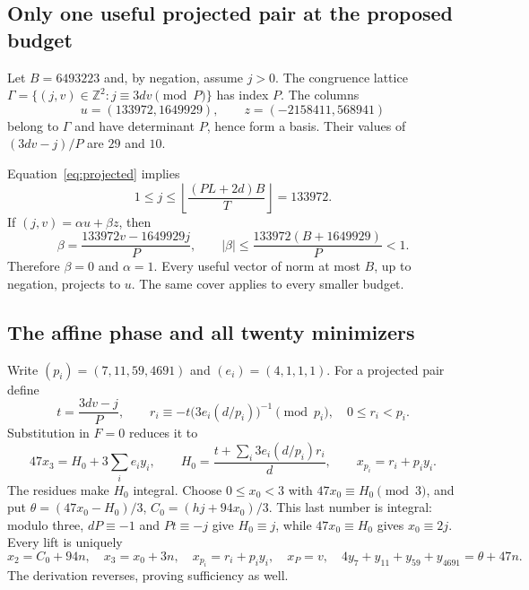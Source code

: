 \documentclass[11pt,a4paper]{article}
\theoremstyle{definition}\newtheorem{question}[theorem]{Question}
\theoremstyle{remark}\newtheorem{remark}[theorem]{Remark}
\newcommand{\Z}{\mathbb Z}\newcommand{\R}{\mathbb R}
\begin{document}
\subsection{Only one useful projected pair at the proposed budget}
Let \(B=6493223\) and, by negation, assume \(j>0\).
The congruence lattice
\(\Gamma=\{(j,v)\in\Z^2:j\equiv3dv\pmod P\}\) has index \(P\).
The columns
\[
 u=(133972,1649929),\qquad z=(-2158411,568941)
\]
belong to \(\Gamma\) and have determinant \(P\), hence form a basis.
Their values of \((3dv-j)/P\) are \(29\) and \(10\).

Equation~\eqref{eq:projected} implies
\[
 1\le j\le\left\lfloor\frac{(PL+2d)B}{T}\right\rfloor=133972.
\]
If \((j,v)=\alpha u+\beta z\), then
\[
 \beta=\frac{133972v-1649929j}{P},\qquad
 |\beta|\le\frac{133972(B+1649929)}P<1.
\]
Therefore \(\beta=0\) and \(\alpha=1\).
Every useful vector of norm at most \(B\), up to negation, projects to
\(u\). The same cover applies to every smaller budget.

\subsection{The affine phase and all twenty minimizers}
Write \((p_i)=(7,11,59,4691)\) and \((e_i)=(4,1,1,1)\).
For a projected pair define
\[
 t=\frac{3dv-j}{P},\qquad
 r_i\equiv-t\bigl(3e_i(d/p_i)\bigr)^{-1}\pmod{p_i},
 \quad 0\le r_i<p_i.
\]
Substitution in \(F=0\) reduces it to
\[
 47x_3=H_0+3\sum_i e_i y_i,\qquad
 H_0=\frac{t+\sum_i3e_i(d/p_i)r_i}{d},\qquad x_{p_i}=r_i+p_i y_i.
\]
The residues make \(H_0\) integral.
Choose \(0\le x_0<3\) with \(47x_0\equiv H_0\pmod3\), and put
\(\theta=(47x_0-H_0)/3\),
\(C_0=(hj+94x_0)/3\).
This last number is integral: modulo three, \(dP\equiv-1\) and
\(Pt\equiv-j\) give \(H_0\equiv j\), while
\(47x_0\equiv H_0\) gives \(x_0\equiv2j\).
Every lift is uniquely
\begin{equation}\label{eq:k47-affine}
 x_2=C_0+94n,\quad x_3=x_0+3n,\quad
 x_{p_i}=r_i+p_i y_i,\quad x_P=v,\quad
 4y_7+y_{11}+y_{59}+y_{4691}=\theta+47n.
\end{equation}
The derivation reverses, proving sufficiency as well.
\end{document}
